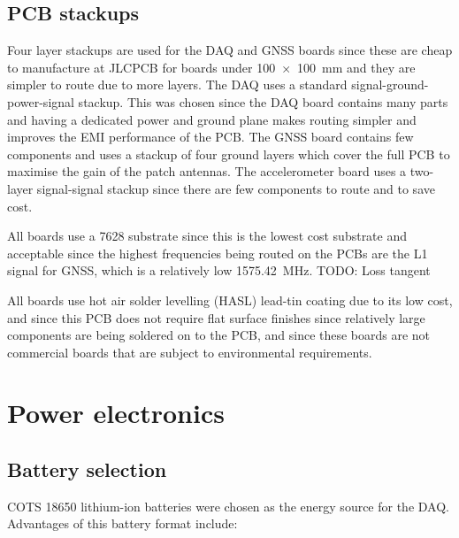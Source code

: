\documentclass[draft]{report}
\begin{document}
\subsection{PCB stackups}
Four layer stackups are used for the DAQ and GNSS boards since these are cheap to manufacture at JLCPCB for boards under \SI{100x100}{\milli\meter} and they are simpler to route due to more layers. The DAQ uses a standard signal-ground-power-signal stackup. This was chosen since the DAQ board contains many parts and having a dedicated power and ground plane makes routing simpler and improves the EMI performance of the PCB. The GNSS board contains few components and uses a stackup of four ground layers which cover the full PCB to maximise the gain of the patch antennas. The accelerometer board uses a two-layer signal-signal stackup since there are few components to route and to save cost.

All boards use a 7628 substrate since this is the lowest cost substrate and acceptable since the highest frequencies being routed on the PCBs are the L1 signal for GNSS, which is a relatively low \SI{1575.42}{\mega\hertz}. TODO: Loss tangent

All boards use hot air solder levelling (HASL) lead-tin coating due to its low cost, and since this PCB does not require flat surface finishes since relatively large components are being soldered on to the PCB, and since these boards are not commercial boards that are subject to environmental requirements.

\section{Power electronics}

\subsection{Battery selection}

COTS 18650 lithium-ion batteries were chosen as the energy source for the DAQ. Advantages of this battery format include:
\end{document}
